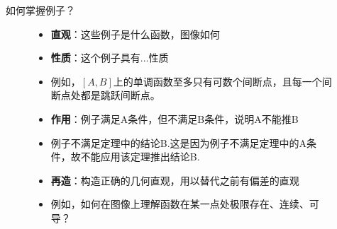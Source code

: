 \documentclass[pdf]{beamer}
\numberwithin{equation}{section}
\theoremstyle{plain}
\theoremstyle{plain}
\theoremstyle{plain}
\theoremstyle{remark}
\begin{document}
\begin{frame}{如何掌握例子？}
\begin{figure}[th]
	\begin{minipage}[t]{.1\textwidth}
	\end{minipage}
	\begin{minipage}[t]{.85\textwidth}
		\begin{itemize}
			\setlength{\itemindent}{-3em}
			\item \textbf{直观}：这些例子是什么函数，图像如何
			\item \textbf{性质}：这个例子具有...性质
			\item[] \phantom{作用：}例如，$[A,B]$上的单调函数至多只有可数个间断点，且每一个间断点处都是跳跃间断点。
			\item \textbf{作用}：例子满足A条件，但不满足B条件，说明A不能推B
			\item[] \phantom{作用：}例子不满足定理中的结论B.这是因为例子不满足定理中的A条件，故不能应用该定理推出结论B.
			
			\item \textbf{再造}：构造正确的几何直观，用以替代之前有偏差的直观
			\item[]\phantom{作用：}例如，如何在图像上理解函数在某一点处极限存在、连续、可导？
		\end{itemize}
	\end{minipage}
\end{figure}

\end{frame}
\end{document}
